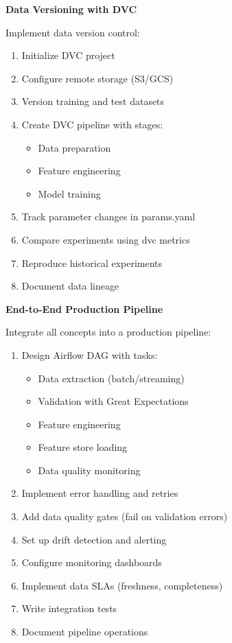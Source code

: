 \begin{exercise}
\textbf{Data Versioning with DVC}

Implement data version control:

\begin{enumerate}
    \item Initialize DVC project
    \item Configure remote storage (S3/GCS)
    \item Version training and test datasets
    \item Create DVC pipeline with stages:
    \begin{itemize}
        \item Data preparation
        \item Feature engineering
        \item Model training
    \end{itemize}
    \item Track parameter changes in params.yaml
    \item Compare experiments using dvc metrics
    \item Reproduce historical experiments
    \item Document data lineage
\end{enumerate}
\end{exercise}

\begin{exercise}
\textbf{End-to-End Production Pipeline}

Integrate all concepts into a production pipeline:

\begin{enumerate}
    \item Design Airflow DAG with tasks:
    \begin{itemize}
        \item Data extraction (batch/streaming)
        \item Validation with Great Expectations
        \item Feature engineering
        \item Feature store loading
        \item Data quality monitoring
    \end{itemize}
    \item Implement error handling and retries
    \item Add data quality gates (fail on validation errors)
    \item Set up drift detection and alerting
    \item Configure monitoring dashboards
    \item Implement data SLAs (freshness, completeness)
    \item Write integration tests
    \item Document pipeline operations
\end{enumerate}
\end{exercise}
